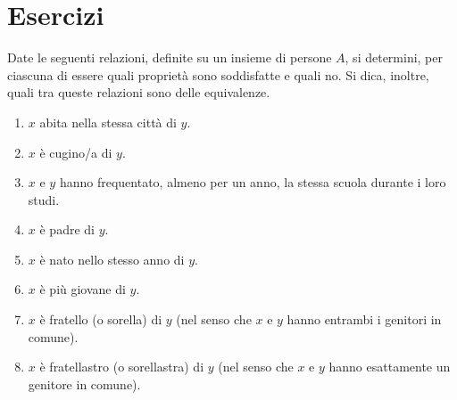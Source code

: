 \newpage


\section{Esercizi}

\begin{esercizio}
Date le seguenti relazioni, definite su un insieme di persone $A$, si determini, per ciascuna di essere quali proprietà sono soddisfatte e quali no. Si dica, inoltre, quali tra queste relazioni sono delle equivalenze.
\begin{enumerate}\setlength\itemsep{1em}
\item $x$ abita nella stessa città di $y$.
\item $x$ è cugino/a di $y$.
\item $x$ e $y$ hanno frequentato, almeno per un anno, la stessa scuola durante i loro studi.
\item $x$ è padre di $y$.
\item $x$ è nato nello stesso anno di $y$.
\item $x$ è più giovane di $y$.
\item $x$ è fratello (o sorella) di $y$ (nel senso che $x$ e $y$ hanno entrambi i genitori in comune).
\item $x$ è fratellastro (o sorellastra) di $y$ (nel senso che $x$ e $y$ hanno esattamente un genitore in comune).
\end{enumerate}
\end{esercizio}


